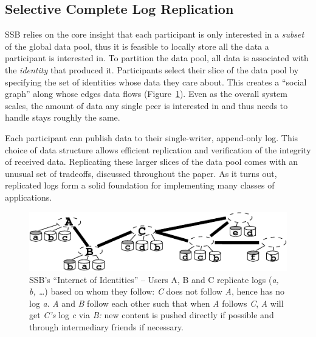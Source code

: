 \documentclass[9pt,sigconf]{acmart}
\begin{document}
\subsection*{Selective Complete Log Replication}

SSB relies on the core insight that each participant is only
interested in a \textit{subset} of the global data pool, thus it is
feasible to locally store all the data a participant is interested
in. To partition the data pool, all data is associated with the
\textit{identity} that produced it. Participants select their slice of
the data pool by specifying the set of identities whose data they care
about. This creates a ``social graph'' along whose edges data flows
(Figure~\ref{fig:net-of-people}). Even as the overall system scales,
the amount of data any single peer is interested in and thus needs to
handle stays roughly the same.

Each participant can publish data to their single-writer, append-only
log. This choice of data structure allows efficient replication and
verification of the integrity of received data. Replicating these
larger slices of the data pool comes with an unusual set of tradeoffs,
discussed throughout the paper. As it turns out, replicated logs form
a solid foundation for implementing many classes of applications.

\begin{figure}[htb]
  \includegraphics[width=0.9\columnwidth]{figs/net-of-people.pdf}
  \caption{SSB's ``Internet of Identities'' -- {\rm\small Users A, B
      and C replicate logs ({\em a, b, \ldots}) based on whom they
      follow: {\em C} does not follow {\em A}, hence has no log {\em
        a}. {\em A} and {\em B} follow each other such that when {\em
        A} follows {\em C}, {\em A} will get {\em C's} log {\em c} via
      {\em B:} new content is pushed directly if possible and through
      intermediary friends if necessary.}}
  \label{fig:net-of-people}
  \vspace*{-2ex}
\end{figure}
\end{document}
